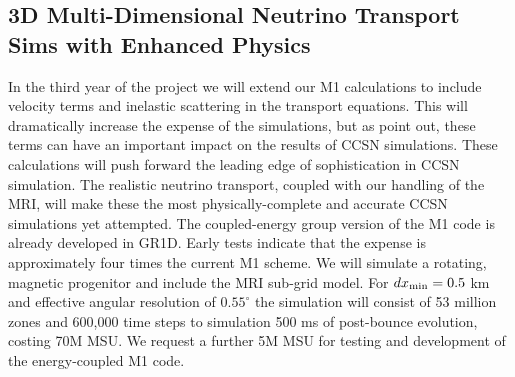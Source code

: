 %


\vspace{0.1in} 

\subsection{3D Multi-Dimensional Neutrino Transport Sims with Enhanced Physics}
\label{sec:enhancedM1}

In the third year of the project we will extend our M1 calculations to include velocity terms and inelastic scattering in the transport equations.
This will dramatically increase the expense of the simulations, but as \citet{Lentz:2012fy} point out, these terms can have an important impact on the results of CCSN simulations.
These calculations will push forward the leading edge of sophistication in CCSN simulation.
The realistic neutrino transport, coupled with our handling of the MRI, will make these the most physically-complete and accurate CCSN simulations yet attempted.
The coupled-energy group version of the M1 code is already developed in GR1D.
Early tests indicate that the expense is approximately four times the current M1 scheme.
We will simulate a rotating, magnetic progenitor and include the MRI sub-grid model.
For $dx_{\rm min} = 0.5$ km and effective angular resolution of $0.55^\circ$ the simulation will consist of 53 million zones and 600,000 time steps to simulation 500 ms of post-bounce evolution, costing 70M MSU.
We request a further 5M MSU for testing and development of the energy-coupled M1 code.

